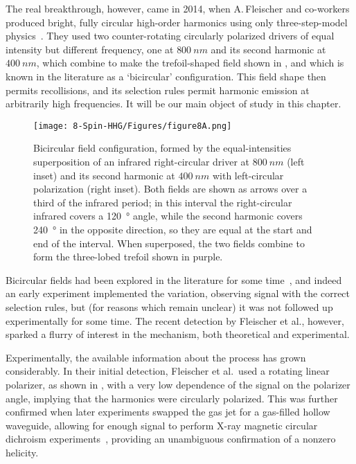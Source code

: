 The real breakthrough, however, came in 2014, when A.\,Fleischer and co-workers produced bright, fully circular high-order harmonics using only three-step-model physics~\cite{fleischer_spin_2014}. They used two counter-rotating circularly polarized drivers of equal intensity but different frequency, one at $\SI{800}{nm}$ and its second harmonic at $\SI{400}{nm}$, which combine to make the trefoil-shaped field shown in , and which is known in the literature as a `bicircular' configuration. This field shape then permits recollisions, and its selection rules permit harmonic emission at arbitrarily high frequencies. It will be our main object of study in this chapter.


\begin{figure}[htb]
  \centering
  \texttt{[image: 8-Spin-HHG/Figures/figure8A.png]}
  \caption[
  Bicircular field configuration: a right-circular $\SI{800}{nm}$ field combines with a left-circular $\SI{400}{nm}$ one to make a trefoil-shaped total field
  ]{
  Bicircular field configuration, formed by the equal-intensities superposition of an infrared right-circular driver at $\SI{800}{nm}$ (left inset) and its second harmonic at $\SI{400}{nm}$ with left-circular polarization (right inset). Both fields are shown as arrows over a third of the infrared period; in this interval the right-circular infrared covers a \SI{120}{\degree} angle, while the second harmonic covers \SI{240}{\degree} in the opposite direction, so they are equal at the start and end of the interval. When superposed, the two fields combine to form the three-lobed trefoil shown in purple.
  }
  \label{f8-bicircular-field-sketch}
\end{figure}

Bicircular fields had been explored in the literature for some time~\cite{ EichmannExperiment, SFALong, SFAMilosevic, milosevic_bicircular-hhg_2000, SFAMilosevicBecker, milosevic_unusual-nonlinear-polarization_2000, milosevic_hhg-laser-phys_2001, averbukh_stability_2002, SFACeccherini, MilosevicIsolatedPulses}, and indeed an early experiment \cite{EichmannExperiment} implemented the variation, observing signal with the correct selection rules, but (for reasons which remain unclear) it was not followed up experimentally for some time. The recent detection by Fleischer et al., however, sparked a flurry of interest in the mechanism, both theoretical and experimental.


Experimentally, the available information about the process has grown considerably. In their initial detection, Fleischer et al.\ used a rotating linear polarizer, as shown in , with a very low dependence of the signal on the polarizer angle, implying that the harmonics were circularly polarized. This was further confirmed when later experiments swapped the gas jet for a gas-filled hollow waveguide, allowing for enough signal to perform X-ray magnetic circular dichroism experiments~\cite{kfir_generation_2015, fan_bright-circularly_2015}, providing an unambiguous confirmation of a nonzero helicity.

